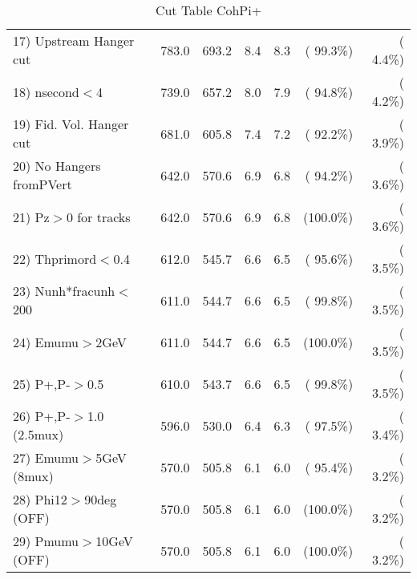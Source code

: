 \begin{table}[h!]
\begin{tabular}{||l||r|r|r|r|r|r||}
 17) Upstream Hanger cut  &        783.0 &        693.2 &          8.4 &          8.3 & ( 99.3\%) & (  4.4\%) \\
 18) nsecond$<$4          &        739.0 &        657.2 &          8.0 &          7.9 & ( 94.8\%) & (  4.2\%) \\
 19) Fid. Vol. Hanger cut &        681.0 &        605.8 &          7.4 &          7.2 & ( 92.2\%) & (  3.9\%) \\
 20) No Hangers fromPVert &        642.0 &        570.6 &          6.9 &          6.8 & ( 94.2\%) & (  3.6\%) \\
 21) Pz$>$0 for tracks    &        642.0 &        570.6 &          6.9 &          6.8 & (100.0\%) & (  3.6\%) \\
 22) Thprimord$<$0.4      &        612.0 &        545.7 &          6.6 &          6.5 & ( 95.6\%) & (  3.5\%) \\
 23) Nunh*fracunh$<$200   &        611.0 &        544.7 &          6.6 &          6.5 & ( 99.8\%) & (  3.5\%) \\
 24) Emumu$>$2GeV         &        611.0 &        544.7 &          6.6 &          6.5 & (100.0\%) & (  3.5\%) \\
 25) P+,P-$>$0.5          &        610.0 &        543.7 &          6.6 &          6.5 & ( 99.8\%) & (  3.5\%) \\
 26) P+,P-$>$1.0 (2.5mux) &        596.0 &        530.0 &          6.4 &          6.3 & ( 97.5\%) & (  3.4\%) \\
 27) Emumu$>$5GeV  (8mux) &        570.0 &        505.8 &          6.1 &          6.0 & ( 95.4\%) & (  3.2\%) \\
 28) Phi12$>$90deg  (OFF) &        570.0 &        505.8 &          6.1 &          6.0 & (100.0\%) & (  3.2\%) \\
 29) Pmumu$>$10GeV  (OFF) &        570.0 &        505.8 &          6.1 &          6.0 & (100.0\%) & (  3.2\%) \\
 \hline
 \hline
 \end{tabular}
 \caption{Cut Table  CohPi+   }
 \label{tab-cutcohjpsi-mumu_cohpip}
 \end{table}
